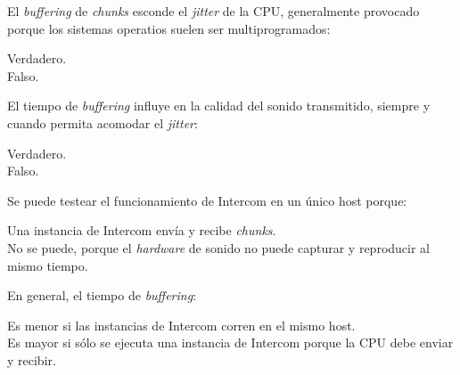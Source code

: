 \documentclass[legalpaper, 12pt, addpoints]{exam}
\begin{document}
\begin{questions}
\vspace{0.10in}

\question El \emph{buffering} de \emph{chunks} esconde el
\emph{jitter} de la CPU, generalmente provocado porque los sistemas
operatios suelen ser multiprogramados:

\begin{oneparchoices}
  \choice Verdadero.\\
  \choice Falso.
\end{oneparchoices}
  
\vspace{0.10in}

\question El tiempo de \emph{buffering} influye en la calidad del
sonido transmitido, siempre y cuando permita acomodar el
\emph{jitter}:

\begin{oneparchoices}
  \choice Verdadero.\\
  \choice Falso.
\end{oneparchoices}
  
\vspace{0.10in}

\question Se puede testear el funcionamiento de Intercom en un único host porque:

\begin{oneparchoices}
  \choice Una instancia de Intercom envía y recibe \emph{chunks}.\\
  \choice No se puede, porque el \emph{hardware} de sonido no puede capturar y reproducir al mismo tiempo.
\end{oneparchoices}
  
\vspace{0.10in}

\question En general, el tiempo de \emph{buffering}:

\begin{oneparchoices}
  \choice Es menor si las instancias de Intercom corren en el mismo host.\\
  \choice Es mayor si sólo se ejecuta una instancia de Intercom porque la CPU debe enviar y recibir.
\end{oneparchoices}
  
\vspace{0.10in}


  

\end{questions}
\end{document}
